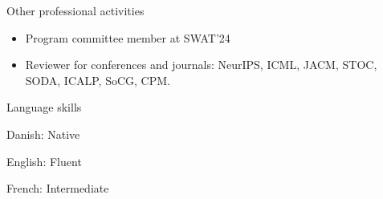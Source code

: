 \documentclass{resume} %
\begin{document}
\begin{rSection}{Other professional activities}
\begin{itemize}
\item Program committee member at SWAT'24
\item Reviewer for conferences and journals: NeurIPS, ICML, JACM, STOC, SODA, ICALP, SoCG, CPM.
\end{itemize}

\end{rSection}


\begin{rSection}{Language skills}
\item Danish: Native
\item English: Fluent
\item French: Intermediate
\end{rSection}




\end{document}
